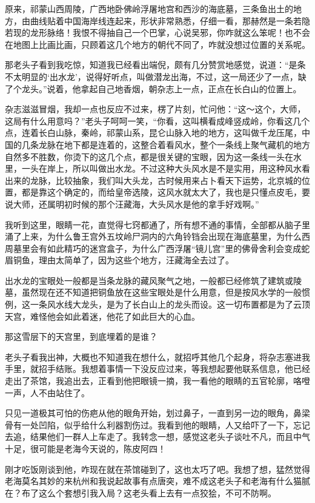 原来，祁蒙山西周陵，广西地卧佛岭浮屠地宫和西沙的海底墓，三条鱼出土的地方，由曲线贴着中国海岸线连起来，形状非常熟悉，仔细一看，那赫然是一条若隐若现的龙形脉络！我恨不得抽自己一个巴掌，心说吴邪，你咋就这么笨呢！也不会在地图上比画比画，只顾着这几个地方的朝代不同了，咋就没想过位置的关系呢。

那老头子看到我吃惊，知道我已经看出端倪，颇有几分赞赏地感觉，说道：“是条不太明显的‘出水龙’，说得好听点，叫做潜龙出海，不过，这一局还少了一点，缺了个龙头。”说着，他拿起自己地香烟，朝杂志上一点，正点在长白山的位置上。

杂志滋滋冒烟，我却一点也反应不过来，楞了片刻，忙问他：“这～这个，大师，这局有什么用意吗？”老头子呵呵一笑，“你看，这叫横看成峰竖成岭，你看这几个点，连着长白山脉，秦岭，祁蒙山系，昆仑山脉入地的地方，这叫做千龙压尾，中国的几条龙脉在地下都是连着的，这整合着看风水，整个一条线上聚气藏机的地方自然多不胜数，你烫下的这几个点，都是很关键的宝眼，因为这一条线一头在水里，一头在岸上，所以叫做出水龙。不过这种大头风水是不是实用，用这种风水看出来的龙脉，比较抽象，我们叫大头龙，古时候用来占卜看天下运势，北京城的位置，都是靠这个确定的，而给皇帝选陵，这风水就太大了，我也是只懂点皮毛，要说大师，还属明初时候的那个汪藏海，大头风水是他的拿手好戏啊。”

我听到这里，眼睛一花，直觉得七窍都通了，所有想不通的事情，全部都从脑子里涌了上来，为什么鲁王宫外五坟岭尸洞内的六角铃铛会出现在海底墓里，为什么西周墓里会有如此精巧的迷宫盒子，为什么广西浮屠“镜儿宫”里的佛骨舍利会变成蛇眉铜鱼，理由太简单了，因为这些个地方，汪藏海全去过了。

出水龙的宝眼处一般都是当条龙脉的藏风聚气之地，一般都已经修筑了建筑或陵墓，虽然现在还不知道把铜鱼放在这些宝眼处是什么用意，但是按风水学的一般惯例，这一条风水线大龙头，是为了长白山上的龙头而设。这一切布置都是为了云顶天宫，难怪他会如此着迷，他花了如此巨大的心血。

那这雪层下的天宫里，到底埋着的是谁？

老头子看我出神，大概也不知道我在想什么，就招呼其他几个起身，将杂志塞进我手里，就招手结账。我想着事情一下没反应过来，等我想起要他联系信息，他已经走出了茶馆，我追出去，正看到他把眼镜一摘，我一看他的眼睛的五官轮廓，咯噔一声，人不由站住了。

只见一道极其可怕的伤疤从他的眼角开始，划过鼻子，一直到另一边的眼角，鼻梁骨有一处凹陷，似乎给什么利器割伤过。我看到他的眼睛，人又给吓了一下，忘记去追，结果他们一群人上车走了。我转念一想，感觉这老头子谈吐不凡，而且中气十足，很可能是老海今天说的，陈皮阿四！

刚才吃饭刚谈到他，咋现在就在茶馆碰到了，这也太巧了吧。我想了想，猛然觉得老海莫名其妙的来杭州和我说起故事有点唐突，难不成这老头子和老海有什么猫腻在？布了这么个套想引我入局？这老头看上去有一点狡狯，不可不防啊。

